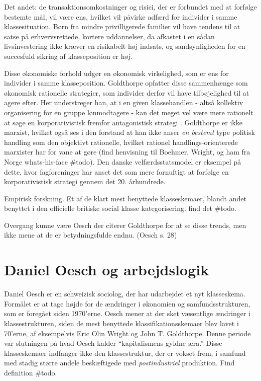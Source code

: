 Det andet: de transaktionsomkostninger og risici, der er forbundet med at forfølge bestemte mål, vil være ens, hvilket vil påvirke adfærd for individer i samme klassesituation. Børn fra mindre privilligerede familier vil have tendens til at satse på erhvervsrettede, kortere uddannelser, da afkastet i en sådan livsinvestering ikke kræver en risikabelt høj indsats, og sandsynligheden for en succesfuld sikring af klasseposition er høj. 

Disse økonomiske forhold udgør en økonomisk virkelighed, som er ens for individer i samme klasseposition. Goldthorpe opfatter disse sammenhænge som økonomisk rationelle strategier, som individer derfor vil have tilbøjelighed til at agere efter. Her understreger han, at i en given klassehandlen - altså kollektiv organisering for en gruppe lønmodtagere - kan det meget vel være mere rationelt at søge en korporativistisk fremfor antagonistisk strategi \parencite[215]{Goldthorpe2002}. Goldthorpe er ikke marxist, hvilket også ses i den forstand at han ikke anser \emph{en bestemt} type politisk handling som den objektivt rationelle, hvilket rationel handlings-orienterede marxister har for vane at gøre (find henvisning til Boehmer, Wright, og ham fra Norge whats-his-face \#todo). Den danske velfærdsstatsmodel er eksempel på dette, hvor fagforeninger har anset det som mere fornuftigt at forfølge en korporativistisk strategi gennem det 20. århundrede. %

Empirisk forskning. Et af de klart mest benyttede klasseskemaer, blandt andet benyttet i den officielle britiske social klasse kategorisering. find det \#todo.

Overgang kunne være Oesch der citerer Goldthorpe for at se disse trends, men ikke mene at de er betydningsfulde endnu. (Oesch s. 28)


\section{Daniel Oesch og arbejdslogik  \label{sec teori klasse Oesch}}

Daniel Oesch er en schweizisk sociolog, der har udarbejdet et nyt klasseskema. Formålet er at tage højde for de ændringer i økonomien og samfundsstrukturen, som er foregået siden 1970'erne.  Oesch mener at der sket væsentlige ændringer i klassestrukturen, siden de mest benyttede klassifikationsskemaer blev lavet i 70'erne, af eksempelvis Eric Olin Wright og John T. Goldthorpe. Denne periode var slutningen på hvad Oesch kalder “kapitalismens gyldne æra.” Disse klasseskemaer indfanger ikke den klassestruktur, der er vokset frem, i samfund med stadig større andele beskæftigede med \emph{postindustriel} produktion. Find definition \#todo. 

